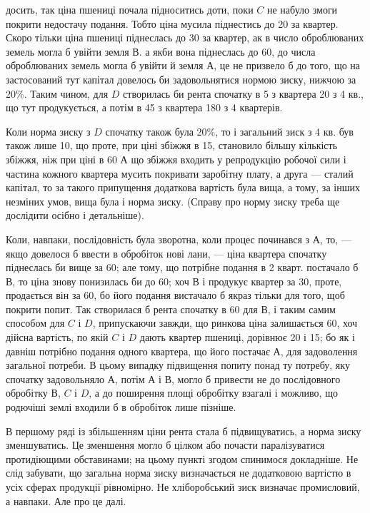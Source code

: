 \parcont{}  %
досить, так ціна пшениці почала підноситись доти, поки $C$ не набуло змоги
покрити недостачу подання. Тобто ціна мусила піднестись до 20 за
квартер. Скоро тільки ціна пшениці піднеслась до 30 за квартер, ак
в число оброблюваних земель могла б увійти земля $В$. а якби вона піднеслась
до 60, до числа оброблюваних земель могла б увійти й земля $А$, це
не призвело б до того, що на застосований тут капітал довелось би задовольнятися
нормою зиску, нижчою за 20\%. Таким чином, для $D$ створилась би
рента спочатку в 5 з квартера \deq{} 20 з 4 кв., що тут продукується,
а потім в 45 з квартера \deq{} 180 з 4 квартерів.

Коли норма зиску з $D$ спочатку також була \deq{} 20\%, то і загальний зиск
з 4 кв. був також лише 10, що проте, при ціні збіжжя в 15, становило
більшу кількість збіжжя, ніж при ціні в 60 А що збіжжя входить
у репродукцію робочої сили і частина кожного квартера мусить покривати заробітну
плату, а друга — сталий капітал, то за такого припущення додаткова
вартість була вища, а тому, за інших незміних умов, вища була і норма зиску.
(Справу про норму зиску треба ще дослідити осібно і детальніше).

Коли, навпаки, послідовність була зворотна, коли процес починався з $А$,
то, — якщо довелося б ввести в обробіток нові лани, — ціна квартера спочатку
піднеслась би вище за 60; але тому, що потрібне подання в 2 кварт. постачало
б $В$, то ціна знову понизилась би до 60; хоч $В$ і продукує квартер
за 30, проте, продається він за 60, бо його подання вистачало б
якраз тільки для того, щоб покрити попит. Так створилася б рента спочатку в
60 для $В$, і таким самим способом для $C$ і $D$, припускаючи завжди, що
ринкова ціна залишається 60, хоч дійсна вартість, по якій $C$ і $D$ дають
квартер пшениці, дорівнює 20 і 15; бо як і давніш потрібно подання одного
квартера, що його постачає $А$, для задоволення загальної потреби. В цьому випадку
підвищення попиту понад ту потребу, яку спочатку задовольняло $А$, потім
$А$ і $В$, могло б привести не до послідовного обробітку $В$, $C$ і $D$, а до поширення
площі обробітку взагалі і можливо, що родючіші землі входили б в обробіток
лише пізніше.

В першому ряді із збільшенням ціни рента стала б підвищуватись, а норма
зиску зменшуватись. Це зменшення могло б цілком або почасти паралізуватися
протидіющими обставинами; на цьому пункті згодом спинимося докладніше.
Не слід забувати, що загальна норма зиску визначається не додатковою вартістю
в усіх сферах продукції рівномірно. Не хліборобський зиск визначає промисловий,
а навпаки. Але про це далі.

